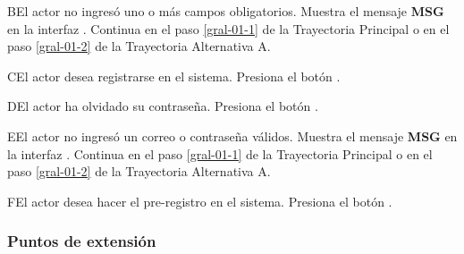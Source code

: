 \begin{UCtrayectoriaA}{B}{El actor no ingresó uno o más campos obligatorios.}
	\UCpaso [\UCsist] Muestra el mensaje \textbf{MSG} en la interfaz  .
	\UCpaso [\UCsist] Continua en el paso \ref{gral-01-1} de la Trayectoria Principal o en el paso \ref{gral-01-2} de la Trayectoria Alternativa A.
\end{UCtrayectoriaA} 

\begin{UCtrayectoriaA}{C}{El actor desea registrarse en el sistema.}
	\UCpaso [\UCsist] Presiona el botón .
\end{UCtrayectoriaA} 

\begin{UCtrayectoriaA}{D}{El actor ha olvidado su contraseña.}
	\UCpaso [\UCsist] Presiona el botón .
\end{UCtrayectoriaA} 

\begin{UCtrayectoriaA}{E}{El actor no ingresó un correo o contraseña válidos.}
	\UCpaso [\UCsist] Muestra el mensaje \textbf{MSG} en la interfaz  .
	\UCpaso [\UCsist] Continua en el paso \ref{gral-01-1} de la Trayectoria Principal o en el paso \ref{gral-01-2} de la Trayectoria Alternativa A.
\end{UCtrayectoriaA} 

\begin{UCtrayectoriaA}{F}{El actor desea hacer el pre-registro en el sistema.}
	\UCpaso [\UCsist] Presiona el botón .
\end{UCtrayectoriaA} 




\subsubsection{Puntos de extensión}


